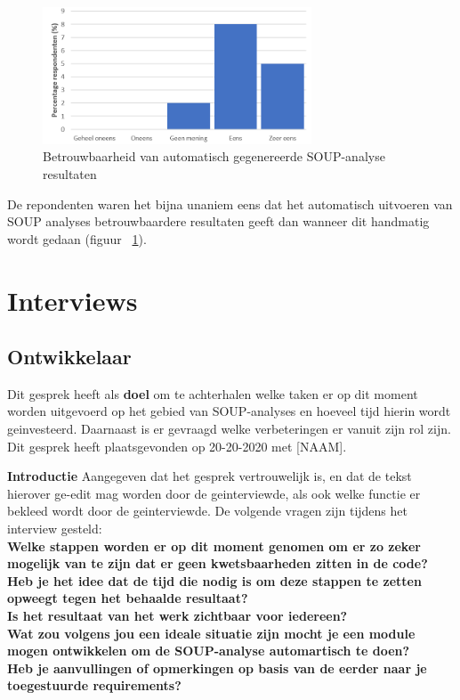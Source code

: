 \begin{figure}[bth]
    \centering
    \includegraphics[width=8cm]{gfx/appendix/Vraag5}
    \caption{Betrouwbaarheid van automatisch gegenereerde SOUP-analyse resultaten }
    \label{fig:enqueteV5}
\end{figure}

De repondenten waren het bijna unaniem eens dat het automatisch uitvoeren van SOUP analyses betrouwbaardere resultaten geeft dan wanneer dit handmatig wordt gedaan (figuur ~\ref{fig:enqueteV5}).

\clearpage
\section{Interviews}\label{sec:interviews}

\subsection{Ontwikkelaar}\label{subsec:ontwikkelaar}
Dit gesprek heeft als \textbf{doel} om te achterhalen welke taken er op dit moment worden uitgevoerd op het gebied van SOUP-analyses en hoeveel tijd hierin wordt geinvesteerd. Daarnaast is er gevraagd welke verbeteringen er vanuit zijn rol zijn. Dit gesprek heeft plaatsgevonden op 20-20-2020 met [NAAM].\smallskip

\textbf{Introductie }
Aangegeven dat het gesprek vertrouwelijk is, en dat de tekst hierover ge-edit mag worden door de geinterviewde, als ook welke functie er bekleed wordt door de geinterviewde. De volgende vragen zijn tijdens het interview gesteld:
\\
\textbf{Welke stappen worden er op dit moment genomen om er zo zeker mogelijk van te zijn dat er geen kwetsbaarheden zitten in de code? }
\\
\textbf{Heb je het idee dat de tijd die nodig is om deze stappen te zetten opweegt tegen het behaalde resultaat?}
\\
\textbf{Is het resultaat van het werk zichtbaar voor iedereen?}
\\
\textbf{Wat zou volgens jou een ideale situatie zijn mocht je een module mogen ontwikkelen om de SOUP-analyse automartisch te doen?  }
\\
\textbf{Heb je aanvullingen of opmerkingen op basis van de eerder naar je toegestuurde requirements?}
\\



